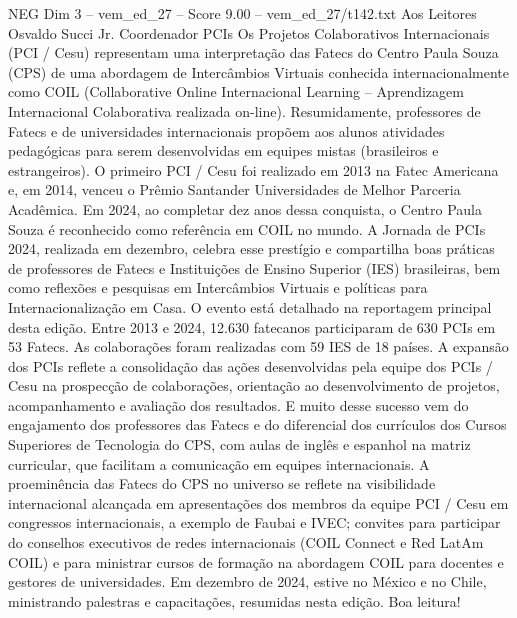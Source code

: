 \begin{textsample}{NEG Dim 3 – vem\_ed\_27 – Score 9.00 – vem\_ed\_27/t142.txt}  \label{ex:f3_neg_182}
Aos Leitores Osvaldo Succi Jr.
Coordenador PCIs Os Projetos Colaborativos Internacionais (PCI / Cesu) representam uma interpretação das Fatecs do Centro Paula Souza (CPS) de uma abordagem de Intercâmbios Virtuais conhecida internacionalmente como COIL (Collaborative Online Internacional Learning – Aprendizagem Internacional Colaborativa realizada on-line).
Resumidamente, professores de Fatecs e de universidades internacionais propõem aos alunos atividades pedagógicas para serem desenvolvidas em equipes mistas (brasileiros e estrangeiros).
O primeiro PCI / Cesu foi realizado em 2013 na Fatec Americana e, em 2014, venceu o Prêmio Santander Universidades de Melhor Parceria Acadêmica.
Em 2024, ao completar dez anos dessa conquista, o Centro Paula Souza é reconhecido como referência em COIL no mundo.
A Jornada de PCIs 2024, realizada em dezembro, celebra esse prestígio e compartilha boas práticas de professores de Fatecs e Instituições de Ensino Superior (IES) brasileiras, bem como reflexões e pesquisas em Intercâmbios Virtuais e políticas para Internacionalização em Casa.
O evento está detalhado na reportagem principal desta edição.
Entre 2013 e 2024, 12.630 fatecanos participaram de 630 PCIs em 53 Fatecs.
As colaborações foram realizadas com 59 IES de 18 países.
A expansão dos PCIs reflete a consolidação das ações desenvolvidas pela equipe dos PCIs / Cesu na prospecção de colaborações, orientação ao desenvolvimento de projetos, acompanhamento e avaliação dos resultados.
E muito desse sucesso vem do engajamento dos professores das Fatecs e do diferencial dos currículos dos Cursos Superiores de Tecnologia do CPS, com aulas de inglês e espanhol na matriz curricular, que facilitam a comunicação em equipes internacionais.
A proeminência das Fatecs do CPS no universo se reflete na visibilidade internacional alcançada em apresentações dos membros da equipe PCI / Cesu em congressos internacionais, a exemplo de Faubai e IVEC; convites para participar do conselhos executivos de redes internacionais (COIL Connect e Red LatAm COIL) e para ministrar cursos de formação na abordagem COIL para docentes e gestores de universidades.
Em dezembro de 2024, estive no México e no Chile, ministrando palestras e capacitações, resumidas nesta edição.
Boa leitura!

\end{textsample}
